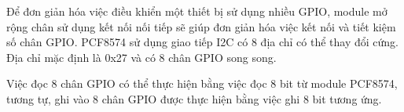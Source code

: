 
Để đơn giản hóa việc điều khiển một thiết bị sử dụng nhiều GPIO, module mở rộng chân sử dụng kết nối nối tiếp sẽ giúp đơn giản hóa việc kết nối và tiết kiệm số chân GPIO. PCF8574 sử dụng giao tiếp I2C có 8 địa chỉ có thể thay đổi cứng. Địa chỉ mặc định là 0x27 và có 8 chân GPIO song song. 

Việc đọc 8 chân GPIO có thể thực hiện bằng việc đọc 8 bit từ module PCF8574, tương tự, ghi vào 8 chân GPIO được thực hiện bằng việc ghi 8 bit tương ứng.
